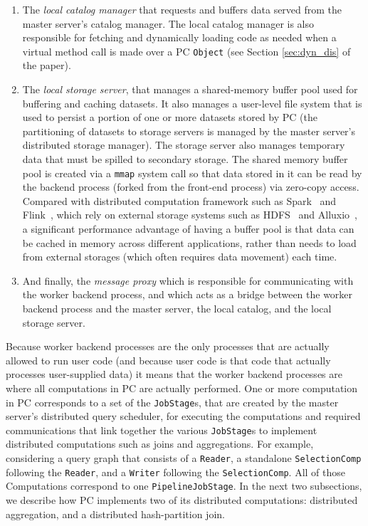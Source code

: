 \begin{enumerate}
\item The \emph{local catalog manager} that requests and 
buffers data served from the master server's catalog manager.  The local catalog manager is also responsible for fetching and dynamically loading
code as needed when a virtual method call is made over a PC \texttt{Object} (see Section \ref{sec:dyn_dis} of the paper).
\item The \emph{local storage server}, that manages a
  shared-memory buffer pool used for buffering and caching datasets.  It also manages
a  user-level file system that is used to persist a portion of one or more datasets stored by PC (the partitioning of datasets to storage servers is managed
by the master server's distributed storage manager).  The storage server also manages temporary data that must be spilled to secondary storage.
The shared memory buffer pool is created via a \texttt{mmap} system call so that
data stored in it can be read by the backend process (forked from
the front-end process) via zero-copy access. Compared with distributed
computation framework such as Spark~\cite{zaharia2010spark} and Flink~\cite{alexandrov2014stratosphere, carbone2015apache}, which rely on
external storage systems such as HDFS~\cite{borthakur2008hdfs} and Alluxio~\cite{li2014tachyon}, a significant
performance advantage of having a buffer pool is that data can be cached in memory
across different applications, rather than needs to load from external
storages (which often requires data movement) each time.
\item And finally, the \emph{message proxy} which is responsible for communicating with the worker backend process, and which acts as a bridge between the
worker backend process and the master server, the local catalog, and the local storage server.

\end{enumerate}

Because worker backend processes are the only processes that are actually allowed to run user code (and because user code is that code that actually processes
user-supplied data) it means that the worker backend processes are
where all computations in PC are actually performed.  One or more computation in PC corresponds 
to a set of the 
\texttt{JobStage}s, that are created by the master server's distributed query scheduler, 
for executing the computations and required communications
that link together the various \texttt{JobStage}s to implement distributed
computations such as joins and aggregations. 
For example, considering a query graph that consists of a \texttt{Reader}, a standalone \texttt{SelectionComp} following
the \texttt{Reader}, and a
\texttt{Writer} following the \texttt{SelectionComp}. All of those Computations correspond
to one \texttt{PipelineJobStage}. In the next two subsections, we
describe how PC implements two of its distributed computations:
distributed aggregation, and a distributed hash-partition join.



